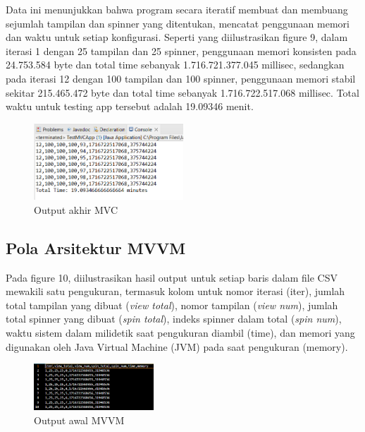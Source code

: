 \documentclass[conference]{IEEEtran}
\begin{document}
	Data ini menunjukkan bahwa program secara iteratif membuat dan membuang sejumlah tampilan dan spinner yang ditentukan, mencatat penggunaan memori dan waktu untuk setiap konfigurasi. Seperti yang diilustrasikan figure 9, dalam iterasi 1 dengan 25 tampilan dan 25 spinner, penggunaan memori konsisten pada 24.753.584 byte dan total time sebanyak 1.716.721.377.045 millisec, sedangkan pada iterasi 12 dengan 100 tampilan dan 100 spinner, penggunaan memori stabil sekitar 215.465.472 byte dan total time sebanyak 1.716.722.517.068 millisec. Total waktu untuk testing app tersebut adalah 19.09346 menit.
	
	\begin{figure}[h]
		\centering
		\includegraphics[width=0.5\textwidth]{images/MVC_END}
		\caption{Output akhir MVC}
		\label{fig:end_mvc}
	\end{figure}
	
	\vspace{3cm}
	
	\subsection{Pola Arsitektur MVVM}
	Pada figure 10, diilustrasikan hasil output untuk setiap baris dalam file CSV mewakili satu pengukuran, termasuk kolom untuk nomor iterasi (iter), jumlah total tampilan yang dibuat (\textit{view total}), nomor tampilan (\textit{view num}), jumlah total spinner yang dibuat (\textit{spin total}), indeks spinner dalam total (\textit{spin num}), waktu sistem dalam milidetik saat pengukuran diambil (time), dan memori yang digunakan oleh Java Virtual Machine (JVM) pada saat pengukuran (memory). 
	
	\begin{figure}[h]
		\centering
		\includegraphics[width=0.4\textwidth]{images/StartMVVM}
		\caption{Output awal MVVM}
		\label{fig:start_mvvm}
	\end{figure}
	
\end{document}
